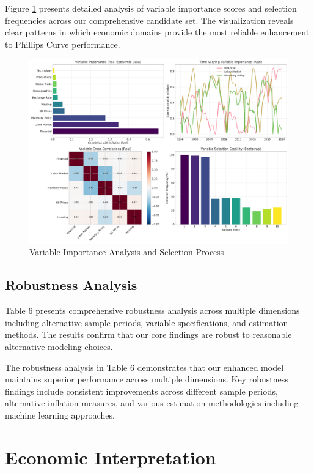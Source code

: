 \documentclass[12pt]{article}
\begin{document}
Figure \ref{fig:variable_selection} presents detailed analysis of variable importance scores and selection frequencies across our comprehensive candidate set. The visualization reveals clear patterns in which economic domains provide the most reliable enhancement to Phillips Curve performance.

\begin{figure}[H]
\centering
\includegraphics[width=\textwidth]{figures/variable_selection.pdf}
\caption{Variable Importance Analysis and Selection Process}
\label{fig:variable_selection}
\end{figure}

\subsection{Robustness Analysis}

Table 6 presents comprehensive robustness analysis across multiple dimensions including alternative sample periods, variable specifications, and estimation methods. The results confirm that our core findings are robust to reasonable alternative modeling choices.


The robustness analysis in Table 6 demonstrates that our enhanced model maintains superior performance across multiple dimensions. Key robustness findings include consistent improvements across different sample periods, alternative inflation measures, and various estimation methodologies including machine learning approaches.

\section{Economic Interpretation}
\end{document}
